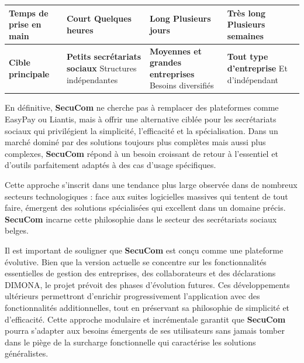 \begin{table}[H]
{\begin{tabular}{p{3.2cm}p{4.2cm}p{4.2cm}p{4.2cm}}
\textbf{Temps de prise en main} & 
\textcolor{green!70!black}{\small\textbf{Court}} \newline
\small{Quelques heures} & 
\textcolor{orange!70!black}{\small\textbf{Long}} \newline
\small{Plusieurs jours} & 
\textcolor{red!70!black}{\small\textbf{Très long}} \newline
\small{Plusieurs semaines} \\
\midrule

\textbf{Cible principale} & 
\textbf{Petits secrétariats sociaux} \newline
\small{Structures indépendantes} & 
\textbf{Moyennes et grandes entreprises} \newline
\small{Besoins diversifiés} & 
\textbf{Tout type d'entreprise} \newline
\small{Et d'indépendant} \\
\bottomrule
\end{tabular}%
}
\end{table}

\vspace{0.5cm}

\noindent En définitive, \textbf{SecuCom} ne cherche pas à remplacer des plateformes comme EasyPay ou Liantis, mais à offrir une alternative ciblée pour les secrétariats sociaux qui privilégient la simplicité, l'efficacité et la spécialisation. Dans un marché dominé par des solutions toujours plus complètes mais aussi plus complexes, \textbf{SecuCom} répond à un besoin croissant de retour à l'essentiel et d'outils parfaitement adaptés à des cas d'usage spécifiques.

\begin{note}
Cette approche s'inscrit dans une tendance plus large observée dans de nombreux secteurs technologiques : face aux suites logicielles massives qui tentent de tout faire, émergent des solutions spécialisées qui excellent dans un domaine précis. \textbf{SecuCom} incarne cette philosophie dans le secteur des secrétariats sociaux belges.
\end{note}

\begin{tcolorbox}[
  title={\textbf{Évolutivité de SecuCom}},
  colback=blue!5!white,
  colframe=primarycolor,
  fonttitle=\bfseries,
  boxrule=0.5mm,
  arc=2mm,
  left=6mm,
  right=6mm,
  top=6mm,
  bottom=6mm
]
\noindent Il est important de souligner que \textbf{SecuCom} est conçu comme une plateforme évolutive. Bien que la version actuelle se concentre sur les fonctionnalités essentielles de gestion des entreprises, des collaborateurs et des déclarations DIMONA, le projet prévoit des phases d'évolution futures. Ces développements ultérieurs permettront d'enrichir progressivement l'application avec des fonctionnalités additionnelles, tout en préservant sa philosophie de simplicité et d'efficacité. Cette approche modulaire et incrémentale garantit que \textbf{SecuCom} pourra s'adapter aux besoins émergents de ses utilisateurs sans jamais tomber dans le piège de la surcharge fonctionnelle qui caractérise les solutions généralistes.
\end{tcolorbox}
